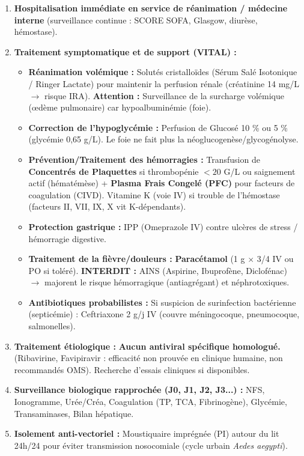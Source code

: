 \documentclass[11pt]{article}
\begin{document}
\begin{exoresolu}
\begin{methode}
\begin{enumerate}
\item \textbf{Hospitalisation immédiate en service de réanimation / médecine interne} (surveillance continue : SCORE SOFA, Glasgow, diurèse, hémostase).
\item \textbf{Traitement symptomatique et de support (VITAL) :}
\begin{itemize}
    \item \textbf{Réanimation volémique :} Solutés cristalloïdes (Sérum Salé Isotonique / Ringer Lactate) pour maintenir la perfusion rénale (créatinine 14 mg/L $\rightarrow$ risque IRA). \textbf{Attention :} Surveillance de la surcharge volémique (œdème pulmonaire) car hypoalbuminémie (foie).
    \item \textbf{Correction de l'hypoglycémie :} Perfusion de Glucosé 10 \% ou 5 \% (glycémie 0,65 g/L). Le foie ne fait plus la néoglucogenèse/glycogénolyse.
    \item \textbf{Prévention/Traitement des hémorragies :} Transfusion de \textbf{Concentrés de Plaquettes} si thrombopénie $< 20$ G/L ou saignement actif (hématémèse) + \textbf{Plasma Frais Congelé (PFC)} pour facteurs de coagulation (CIVD). Vitamine K (voie IV) si trouble de l'hémostase (facteurs II, VII, IX, X vit K-dépendants).
    \item \textbf{Protection gastrique :} IPP (Omeprazole IV) contre ulcères de stress / hémorragie digestive.
    \item \textbf{Traitement de la fièvre/douleurs :} \textbf{Paracétamol} (1 g $\times$ 3/4 IV ou PO si toléré). \textbf{INTERDIT :} AINS (Aspirine, Ibuprofène, Diclofénac) $\rightarrow$ majorent le risque hémorragique (antiagrégant) et néphrotoxiques.
    \item \textbf{Antibiotiques probabilistes :} Si suspicion de surinfection bactérienne (septicémie) : Ceftriaxone 2 g/j IV (couvre méningocoque, pneumocoque, salmonelles).
\end{itemize}
\item \textbf{Traitement étiologique :} \textbf{Aucun antiviral spécifique homologué.} (Ribavirine, Favipiravir : efficacité non prouvée en clinique humaine, non recommandés OMS). Recherche d'essais cliniques si disponibles.
\item \textbf{Surveillance biologique rapprochée (J0, J1, J2, J3...) :} NFS, Ionogramme, Urée/Créa, Coagulation (TP, TCA, Fibrinogène), Glycémie, Transaminases, Bilan hépatique.
\item \textbf{Isolement anti-vectoriel :} Moustiquaire imprégnée (PI) autour du lit 24h/24 pour éviter transmission nosocomiale (cycle urbain \emph{Aedes aegypti}).
\end{enumerate}
\end{methode}


\end{exoresolu}
\end{document}
